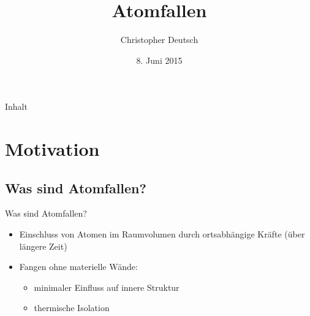 \documentclass[12pt,xcolor=dvipsnames]{beamer}
\author[Christopher Deutsch]
{Christopher Deutsch}
\title
{Atomfallen}
\subtitle
{}
\institute[]
{Rheinische Friedrich-Wilhelms-Universität Bonn \\
Proseminar Präsentationstechnik SS15}
\date{8. Juni 2015}
\begin{document}
\maketitle

\begin{frame}{Inhalt}
	\tableofcontents
\end{frame}


\section{Motivation}

\subsection{Was sind Atomfallen?}
\begin{frame}{Was sind Atomfallen?}
	\begin{itemize}
		\setlength\itemsep{1em}
		\item Einschluss von Atomen im Raumvolumen durch ortsabhängige Kräfte (über längere Zeit)
		
		\item Fangen ohne materielle Wände:
		\begin{itemize}
			\item minimaler Einfluss auf innere Struktur
			
			\item thermische Isolation
		\end{itemize}

	\end{itemize}
\end{frame}
\end{document}
